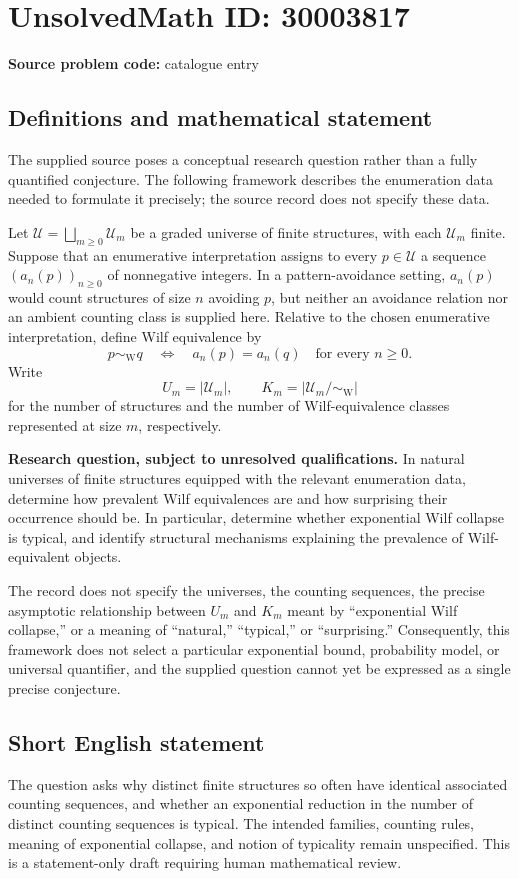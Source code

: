 \documentclass[11pt]{article}
\begin{document}
\section*{UnsolvedMath ID: 30003817}
\textbf{Source problem code:} catalogue entry
\subsection{Definitions and mathematical statement}
The supplied source poses a conceptual research question rather than a fully quantified conjecture. The following framework describes the enumeration data needed to formulate it precisely; the source record does not specify these data.

Let \(\mathcal U=\bigsqcup_{m\geq 0}\mathcal U_m\) be a graded universe of finite structures, with each \(\mathcal U_m\) finite. Suppose that an enumerative interpretation assigns to every \(p\in\mathcal U\) a sequence \((a_n(p))_{n\geq 0}\) of nonnegative integers. In a pattern-avoidance setting, \(a_n(p)\) would count structures of size \(n\) avoiding \(p\), but neither an avoidance relation nor an ambient counting class is supplied here. Relative to the chosen enumerative interpretation, define Wilf equivalence by
\[
 p\sim_{\mathrm W}q
 \quad\Longleftrightarrow\quad
 a_n(p)=a_n(q)\quad\text{for every }n\geq 0.
\]
Write
\[
 U_m=|\mathcal U_m|,
 \qquad
 K_m=\bigl|\mathcal U_m/\!\sim_{\mathrm W}\bigr|
\]
for the number of structures and the number of Wilf-equivalence classes represented at size \(m\), respectively.

\textbf{Research question, subject to unresolved qualifications.} In natural universes of finite structures equipped with the relevant enumeration data, determine how prevalent Wilf equivalences are and how surprising their occurrence should be. In particular, determine whether exponential Wilf collapse is typical, and identify structural mechanisms explaining the prevalence of Wilf-equivalent objects.

The record does not specify the universes, the counting sequences, the precise asymptotic relationship between \(U_m\) and \(K_m\) meant by ``exponential Wilf collapse,'' or a meaning of ``natural,'' ``typical,'' or ``surprising.'' Consequently, this framework does not select a particular exponential bound, probability model, or universal quantifier, and the supplied question cannot yet be expressed as a single precise conjecture.
\subsection{Short English statement}
The question asks why distinct finite structures so often have identical associated counting sequences, and whether an exponential reduction in the number of distinct counting sequences is typical. The intended families, counting rules, meaning of exponential collapse, and notion of typicality remain unspecified. This is a statement-only draft requiring human mathematical review.
\end{document}

